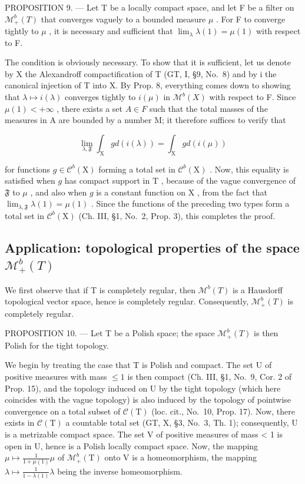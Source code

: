 PROPOSITION 9. --- Let T be a locally compact space, and let F be a filter on \(\mathcal{M}_{+}^{b}(T)\) that converges vaguely to a bounded measure \(\mu\) . For F to converge tightly to \(\mu\) , it is necessary and sufficient that \(\lim_{\lambda}\lambda(1)=\mu(1)\) with respect to F.

The condition is obviously necessary. To show that it is sufficient, let us denote by X the Alexandroff compactification of T (GT, I, §9, No.~8) and by i the canonical injection of T into X. By Prop. 8, everything comes down to showing that \(\lambda \mapsto i(\lambda)\) converges tightly to \(i(\mu)\) in \(\mathcal{M}^{b}(X)\) with respect to F. Since \(\mu(1) < +\infty\) , there exists a set \(A \in F\) such that the total masses of the measures in A are bounded by a number M; it therefore suffices to verify that

\[
\lim _ {\lambda , \mathfrak {F}} \int_ {\mathrm{X}} g d (i (\lambda)) = \int_ {\mathrm{X}} g d (i (\mu))\tag{5}
\]

for functions \(g \in \mathcal{C}^b(\mathrm{X})\) forming a total set in \(\mathcal{C}^b(\mathrm{X})\) . Now, this equality is satisfied when \(g\) has compact support in \(\mathrm{T}\) , because of the vague convergence of \(\mathfrak{F}\) to \(\mu\) , and also when \(g\) is a constant function on \(\mathrm{X}\) , from the fact that \(\lim_{\lambda, \mathfrak{F}} \lambda(1) = \mu(1)\) . Since the functions of the preceding two types form a total set in \(\mathcal{C}^b(\mathrm{X})\) (Ch. III, §1, No.~2, Prop. 3), this completes the proof.

\subsection{\texorpdfstring{Application: topological properties of the space \(\mathcal{M}_{+}^{b}(T)\)}{Application: topological properties of the space \textbackslash mathcal\{M\}\_\{+\}\^{}\{b\}(T)}}

We first observe that if T is completely regular, then \(\mathcal{M}^{b}(T)\) is a Hausdorff topological vector space, hence is completely regular. Consequently, \(\mathcal{M}_{+}^{b}(T)\) is completely regular.

PROPOSITION 10. --- Let T be a Polish space; the space \(\mathcal{M}_{+}^{b}(T)\) is then Polish for the tight topology.

We begin by treating the case that T is Polish and compact. The set U of positive measures with mass \(\leqslant 1\) is then compact (Ch. III, §1, No.~9, Cor. 2 of Prop. 15), and the topology induced on U by the tight topology (which here coincides with the vague topology) is also induced by the topology of pointwise convergence on a total subset of \(\mathcal{C}(\mathrm{T})\) (loc. cit., No.~10, Prop. 17). Now, there exists in \(\mathcal{C}(\mathrm{T})\) a countable total set (GT, X, §3, No.~3, Th. 1); consequently, U is a metrizable compact space. The set V of positive measures of mass \textless{} 1 is open in U, hence is a Polish locally compact space. Now, the mapping \(\mu \mapsto \frac{1}{1 + \mu(1)}\mu\) of \(\mathcal{M}_{+}^{b}(\mathrm{T})\) onto V is a homeomorphism, the mapping \(\lambda \mapsto \frac{1}{1 - \lambda(1)}\lambda\) being the inverse homeomorphism.


